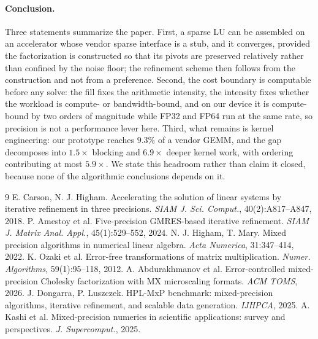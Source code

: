 \documentclass[11pt]{article}
\theoremstyle{remark}
\begin{document}
\paragraph{Conclusion.}
Three statements summarize the paper. First, a sparse LU can be assembled on an
accelerator whose vendor sparse interface is a stub, and it converges, provided
the factorization is constructed so that its pivots are preserved relatively
rather than confined by the noise floor; the refinement scheme then follows from
the construction and not from a preference. Second, the cost boundary is
computable before any solve: the fill fixes the arithmetic intensity, the
intensity fixes whether the workload is compute- or bandwidth-bound, and on our
device it is compute-bound by two orders of magnitude while FP32 and FP64 run at
the same rate, so precision is not a performance lever here. Third, what remains
is kernel engineering: our prototype reaches $9.3\%$ of a vendor GEMM, and the
gap decomposes into $1.5\times$ blocking and $6.9\times$ deeper kernel work, with
ordering contributing at most $5.9\times$. We state this headroom rather than
claim it closed, because none of the algorithmic conclusions depends on it.

\begin{thebibliography}{9}
 E. Carson, N. J. Higham. Accelerating the solution of linear systems
by iterative refinement in three precisions. \emph{SIAM J. Sci. Comput.},
40(2):A817--A847, 2018.
 P. Amestoy et al. Five-precision GMRES-based iterative
refinement. \emph{SIAM J. Matrix Anal. Appl.}, 45(1):529--552, 2024.
 N. J. Higham, T. Mary. Mixed precision algorithms in numerical linear
algebra. \emph{Acta Numerica}, 31:347--414, 2022.
 K. Ozaki et al. Error-free transformations of matrix
multiplication. \emph{Numer. Algorithms}, 59(1):95--118, 2012.
 A. Abdurakhmanov et al. Error-controlled mixed-precision Cholesky
factorization with MX microscaling formats. \emph{ACM TOMS}, 2026.
 J. Dongarra, P. Luszczek. HPL-MxP benchmark: mixed-precision
algorithms, iterative refinement, and scalable data generation. \emph{IJHPCA}, 2025.
 A. Kashi et al. Mixed-precision numerics in scientific
applications: survey and perspectives. \emph{J. Supercomput.}, 2025.
\end{thebibliography}
\end{document}
